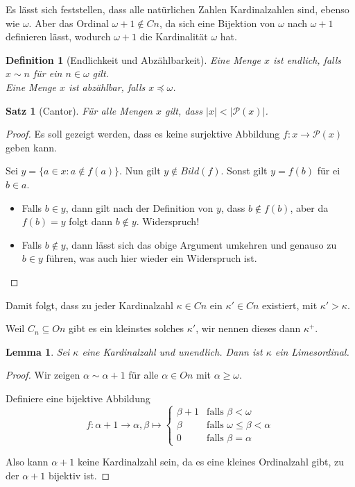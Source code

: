 \documentclass[german]{article}
\theoremstyle{break}
\theoremstyle{def_style}
\newtheorem{definition}{Definition}[section]
\theoremstyle{def_style}
\newtheorem{satz}{Satz}[section]
\theoremstyle{lemma_style}
\newtheorem{lemma}{Lemma}[subsection]
\newcommand{\Pot}[1]{\mathcal{P}(#1)}
\begin{document}
Es lässt sich feststellen, dass alle natürlichen Zahlen Kardinalzahlen sind, ebenso wie $\omega$. Aber das Ordinal $\omega+1\notin Cn$, da sich eine Bijektion von $\omega$ nach $\omega+1$ definieren lässt, wodurch $\omega+1$ die Kardinalität $\omega$ hat.

\begin{definition}[Endlichkeit und Abzählbarkeit]
	Eine Menge $x$ ist \textit{endlich}, falls $x\sim n$ für ein $n\in \omega$ gilt.
	\\
	Eine Menge $x$ ist \textit{abzählbar}, falls $x\preceq \omega$.
\end{definition}

\begin{satz}[Cantor]
	Für alle Mengen $x$ gilt, dass $\vert x \vert <\vert \Pot{x}\vert$.
	\label{SatzVonCantor}
\end{satz}
\begin{proof}
	Es soll gezeigt werden, dass es keine surjektive Abbildung $f:x\to\Pot{x}$ geben kann.
	
	Sei $y=\{a\in x : a\notin f(a)\}$. Nun gilt $y\notin Bild(f)$. Sonst gilt $y=f(b)$ für ei $b\in a$.
	\begin{itemize}
		\item Falls $b\in y$, dann gilt nach der Definition von $y$, dass $b\notin f(b)$, aber da $f(b)=y$ folgt dann $b\notin y$. Widerspruch!
		\item Falls $b\notin y$, dann lässt sich das obige Argument umkehren und genauso zu $b\in y$ führen, was auch hier wieder ein Widerspruch ist.
	\end{itemize}
\end{proof}

Damit folgt, dass zu jeder Kardinalzahl $\kappa\in Cn$ ein $\kappa'\in Cn$ existiert, mit $\kappa'>\kappa$.

Weil $C_n\subseteq On$ gibt es ein kleinstes solches $\kappa'$, wir nennen dieses dann $\kappa^+$.

\begin{lemma}
	Sei $\kappa$ eine Kardinalzahl und unendlich. Dann ist $\kappa$ ein Limesordinal.
\end{lemma}
\begin{proof}
	Wir zeigen $\alpha\sim \alpha+1$ für alle $\alpha\in On$ mit $\alpha \geq \omega$.
	
	Definiere eine bijektive Abbildung 
	$$f:\alpha+1\to \alpha, \beta \mapsto
		\begin{cases}
			\beta+1 & \text{falls } \beta <\omega \\
			\beta & \text{falls } \omega \leq \beta < \alpha \\
			0 & \text{falls } \beta=\alpha
		\end{cases}$$
	
	Also kann $\alpha+1$ keine Kardinalzahl sein, da es eine kleines Ordinalzahl gibt, zu der $\alpha+1$ bijektiv ist.
\end{proof}
\end{document}
